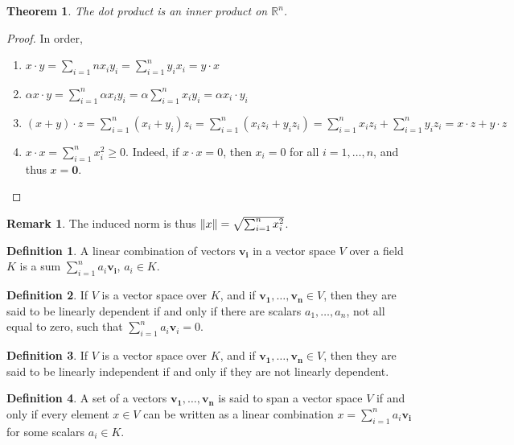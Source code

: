 \documentclass[oneside]{book}
\newtheorem{theorem}{Theorem}[section]
\theoremstyle{definition}
\newtheorem{definition}{Definition}[section]
\newtheorem{remark}{Remark}[section]
\newcommand*\B[1]{\mathbf{#1}}
\begin{document}
\begin{theorem}
The dot product is an inner product on $\mathbb{R}^n$.
\end{theorem}
\begin{proof}
In order,
\begin{enumerate}
\item $x\cdot y = \sum_{i=1}{n} x_i y_i = \sum_{i=1}^{n} y_i x_i = y\cdot x$
\item $\alpha x\cdot y = \sum_{i=1}^{n} \alpha x_i y_i = \alpha \sum_{i=1}^{n} x_i y_i = \alpha x_i \cdot y_i$
\item $(x+y)\cdot z = \sum_{i=1}^{n} (x_i+y_i)z_i = \sum_{i=1}^{n} (x_iz_i +y_i z_i)=\sum_{i=1}^{n}x_i z_i+\sum_{i=1}^{n} y_i z_i = x\cdot z + y\cdot z$
\item $x\cdot x = \sum_{i=1}^{n} x_i^2 \geq 0$. Indeed, if $x\cdot x = 0$, then $x_i = 0$ for all $i=1,\hdots, n$, and thus $x=\B{0}$.
\end{enumerate}
\end{proof}

\begin{remark}
The induced norm is thus $\norm{x} = \sqrt{\sum_{i=1}^{n} x_i^2}$.
\end{remark}

\begin{definition}
A linear combination of vectors $\B{v_i}$ in a vector space $V$ over a field $K$ is a sum $\sum_{i=1}^{n} a_i \B{v_i}$, $a_i \in K$.
\end{definition}

\begin{definition}
If $V$ is a vector space over $K$, and if $\B{v_1},\hdots, \B{v_n}\in V$, then they are said to be linearly dependent if and only if there are scalars $a_1,\hdots, a_n$, not all equal to zero, such that $\sum_{i=1}^{n} a_i \B{v}_i = 0$.
\end{definition}

\begin{definition}
If $V$ is a vector space over $K$, and if $\B{v_1},\hdots, \B{v_n}\in V$, then they are said to be linearly independent if and only if they are not linearly dependent.
\end{definition}

\begin{definition}
A set of a vectors $\B{v_1},\hdots, \B{v_n}$ is said to span a vector space $V$ if and only if every element $x\in V$ can be written as a linear combination $x=\sum_{i=1}^{n} a_i \B{v_i}$ for some scalars $a_i \in K$.
\end{definition}
\end{document}
